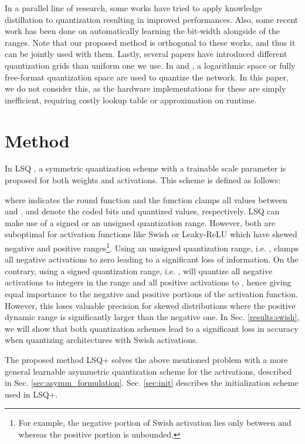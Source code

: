 \documentclass[10pt,twocolumn,letterpaper]{article}
\begin{document}
In a parallel line of research, some works \cite{qkd,mishra2017apprentice,polino2018model} have tried to apply knowledge distillation to quantization resulting in improved performances. Also, some recent work \cite{dq2020} has been done on automatically learning the bit-width alongside of the ranges. Note that our proposed method is orthogonal to these works, and thus it can be jointly used with them. Lastly, several papers have introduced different quantization grids than uniform one we use. In \cite{miyashita2016convlog} and \cite{ullrich2018}, a logarithmic space or fully free-format quantization space are used to quantize the network. In this paper, we do not consider this, as the hardware implementations for these are simply inefficient, requiring costly lookup table or approximation on runtime.

\section{Method}
\label{sec:method}
In LSQ \cite{lsq}, a symmetric quantization scheme with a trainable scale parameter is proposed for both weights and activations. This scheme is defined as follows:

where  indicates the round function and the  function clamps all values between  and .  and  denote the coded bits and quantized values, respectively. 
LSQ can make use of a signed or an unsigned quantization range. However, both are suboptimal for activation functions like Swish or Leaky-ReLU which have skewed negative and positive ranges\footnote{For example, the negative portion of Swish activation lies only between  and  whereas the positive portion is unbounded.}. 
Using an unsigned quantization range, i.e. , clamps all negative activations to zero leading to a significant loss of information. 
On the contrary, using a signed quantization range, i.e. , will quantize all negative activations to integers in the range  and all positive activations to , hence giving equal importance to the negative and positive portions of the activation function. 
However, this loses valuable precision for skewed distributions where the positive dynamic range is significantly larger than the negative one. In Sec. \ref{results:swish}, we will show that both quantization schemes lead to a significant loss in accuracy when quantizing architectures with Swish activations.


The proposed method LSQ+ solves the above mentioned problem with a more general learnable asymmetric quantization scheme for the activations, described in Sec. \ref{sec:asymm_formulation}. Sec. \ref{sec:init} describes the initialization scheme used in LSQ+. 
\end{document}
